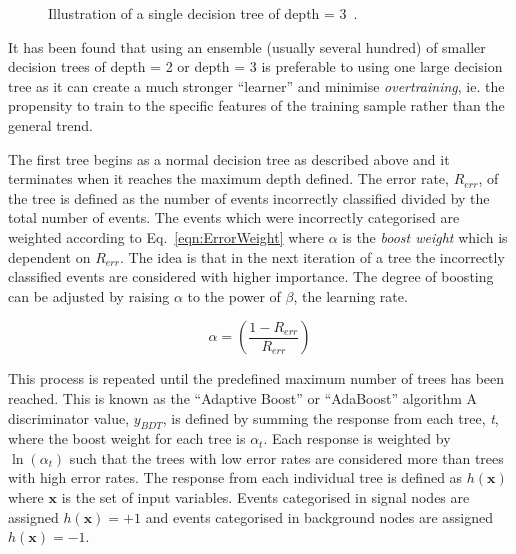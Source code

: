 \begin{figure}[h!]
\begin{center}
\hspace{0.2cm}
\end{center}
\caption{Illustration of a single decision tree of depth = 3~\cite{2007physics3039H}.}
\label{fig:DecisionTree}
\end{figure} 

It has been found that using an ensemble (usually several hundred) of smaller decision trees of depth = 2 or depth = 3 is preferable to using one large decision tree as it can create a much stronger ``learner'' and minimise \emph{overtraining}, ie. the propensity to train to the specific features of the training sample rather than the general trend. 

The first tree begins as a normal decision tree as described above and it terminates when it reaches the maximum depth defined. The error rate, $R_{err}$, of the tree is defined as the number of events incorrectly classified divided by the total number of events. The events which were incorrectly categorised are weighted according to Eq.~\ref{eqn:ErrorWeight} where $\alpha$ is the \emph{boost weight} which is dependent on $R_{err}$. The idea is that in the next iteration of a tree the incorrectly classified events are considered with higher importance. The degree of boosting can be adjusted by raising $\alpha$ to the power of $\beta$, the learning rate.

\begin{equation}
\alpha = \left( \frac{1-R_{err}}{R_{err}}  \right)
\label{eqn:ErrorWeight}
\end{equation}

This process is repeated until the predefined maximum number of trees has been reached. This is known as the ``Adaptive Boost'' or ``AdaBoost'' algorithm
A discriminator value, $y_{BDT}$, is defined by summing the response from each tree, \emph{t}, where the boost weight for each tree is $\alpha_{t}$. Each response is weighted by $\ln \left(\alpha_{t}\right)$ such that the trees with low error rates are considered more than trees with high error rates. The response from each individual tree is defined as $h\left(\textbf{x}\right)$ where $\textbf{x}$ is the set of input variables. Events categorised in signal nodes are assigned $h\left(\textbf{x}\right) = +1 $ and events categorised in background nodes are assigned $h\left(\textbf{x}\right) = -1 $. 

